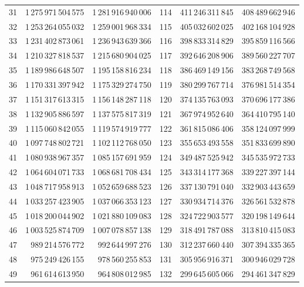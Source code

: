 \begin{longtable}{@{}r r r@{\qquad\qquad}r r r@{}}
31 & 1\,275\,971\,504\,575 & 1\,281\,916\,940\,006 & 114 & 411\,246\,311\,845 & 408\,489\,662\,946\\
32 & 1\,253\,264\,055\,032 & 1\,259\,001\,968\,334 & 115 & 405\,032\,602\,025 & 402\,168\,104\,928\\
33 & 1\,231\,402\,873\,061 & 1\,236\,943\,639\,366 & 116 & 398\,833\,314\,829 & 395\,859\,116\,566\\
34 & 1\,210\,327\,818\,537 & 1\,215\,680\,904\,025 & 117 & 392\,646\,208\,906 & 389\,560\,227\,707\\
35 & 1\,189\,986\,648\,507 & 1\,195\,158\,816\,234 & 118 & 386\,469\,149\,156 & 383\,268\,749\,568\\
36 & 1\,170\,331\,397\,942 & 1\,175\,329\,274\,750 & 119 & 380\,299\,767\,714 & 376\,981\,514\,354\\
37 & 1\,151\,317\,613\,315 & 1\,156\,148\,287\,118 & 120 & 374\,135\,763\,093 & 370\,696\,177\,386\\
38 & 1\,132\,905\,886\,597 & 1\,137\,575\,817\,319 & 121 & 367\,974\,952\,640 & 364\,410\,795\,140\\
39 & 1\,115\,060\,842\,055 & 1\,119\,574\,919\,777 & 122 & 361\,815\,086\,406 & 358\,124\,097\,999\\
40 & 1\,097\,748\,802\,721 & 1\,102\,112\,768\,050 & 123 & 355\,653\,493\,558 & 351\,833\,699\,890\\
41 & 1\,080\,938\,967\,357 & 1\,085\,157\,691\,959 & 124 & 349\,487\,525\,942 & 345\,535\,972\,733\\
42 & 1\,064\,604\,071\,733 & 1\,068\,681\,708\,434 & 125 & 343\,314\,177\,368 & 339\,227\,397\,144\\
43 & 1\,048\,717\,958\,913 & 1\,052\,659\,688\,523 & 126 & 337\,130\,791\,040 & 332\,903\,443\,659\\
44 & 1\,033\,257\,423\,905 & 1\,037\,066\,353\,123 & 127 & 330\,934\,714\,376 & 326\,561\,532\,878\\
45 & 1\,018\,200\,044\,902 & 1\,021\,880\,109\,083 & 128 & 324\,722\,903\,577 & 320\,198\,149\,644\\
46 & 1\,003\,525\,874\,709 & 1\,007\,078\,857\,138 & 129 & 318\,491\,787\,088 & 313\,810\,415\,083\\
47 & 989\,214\,576\,772 & 992\,644\,997\,276 & 130 & 312\,237\,660\,440 & 307\,394\,335\,365\\
48 & 975\,249\,426\,155 & 978\,560\,255\,853 & 131 & 305\,956\,916\,371 & 300\,946\,029\,728\\
49 & 961\,614\,613\,950 & 964\,808\,012\,985 & 132 & 299\,645\,605\,066 & 294\,461\,347\,829\\

\end{longtable}
